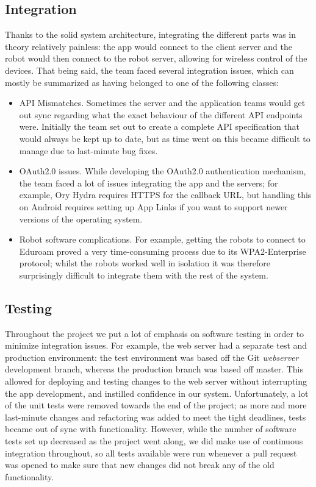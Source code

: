 \documentclass[onecolumn]{IEEEtran}
\makeatletter
\def\subsubsection{\@startsection{subsubsection}{3}{\z@}{0ex plus 0.1ex minus 0.1ex}{0ex}{\normalfont\normalsize\itshape}}
\makeatother
\begin{document}
{\subsection{Integration}
{Thanks to the solid system architecture, integrating the different parts was in theory relatively painless: the app would connect to the client server and the robot would then connect to the robot server, allowing for wireless control of the devices. That being said, the team faced several integration issues, which can mostly be summarized as having belonged to one of the following classes:}
    \begin{itemize}
        \item {API Mismatches. Sometimes the server and the application teams would get out sync regarding what the exact behaviour of the different API endpoints were. Initially the team set out to create a complete API specification that would always be kept up to date, but as time went on this became difficult to manage due to last-minute bug fixes.}
        \item {OAuth2.0 issues. While developing the OAuth2.0 authentication mechanism, the team faced a lot of issues integrating the app and the servers; for example, Ory Hydra requires HTTPS for the callback URL, but handling this on Android requires setting up App Links if you want to support newer versions of the operating system.}
        \item {Robot software complications. For example, getting the robots to connect to Eduroam proved a very time-consuming process due to its WPA2-Enterprise protocol; whilst the robots worked well in isolation it was therefore surprisingly difficult to integrate them with the rest of the system.}
    \end{itemize}
\subsection{Testing}
    \subsubsection{Software Testing}
        {Throughout the project we put a lot of emphasis on software testing in order to minimize integration issues. For example, the web server had a separate test and production environment: the test environment was based off the Git \textit{webserver} development branch, whereas the production branch was based off master. This allowed for deploying and testing changes to the web server without interrupting the app development, and instilled confidence in our system. Unfortunately, a lot of the unit tests were removed towards the end of the project; as more and more last-minute changes and refactoring was added to meet the tight deadlines, tests became out of sync with functionality. However, while the number of software tests set up decreased as the project went along, we did make use of continuous integration throughout, so all tests available were run whenever a pull request was opened to make sure that new changes did not break any of the old functionality.}
}
\end{document}
